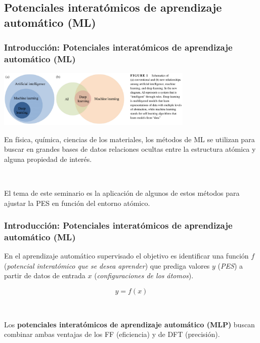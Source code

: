 \documentclass[aspectratio=169]{beamer}
\let\oldtextbf\textbf
\renewcommand{\textbf}[1]{\textcolor{nordblue}{\oldtextbf{#1}}}
\begin{document}
    \subsection{Potenciales interatómicos de aprendizaje automático (ML)}
    
    \begin{frame}
        \frametitle{Introducción: Potenciales interatómicos de aprendizaje 
        automático (ML)}

        \begin{center}
            \includegraphics[width=0.7\textwidth]{intro-definicion-ML.png}
        \end{center}

        \pause
    
        En física, química, ciencias de los materiales, los métodos de ML se
        utilizan para buscar en grandes bases de datos relaciones ocultas entre 
        la estructura atómica y alguna propiedad de interés.

        \ \pause

        El tema de este seminario es la aplicación de algunos de estos métodos
        para ajustar la PES en función del entorno atómico.

	\end{frame}
	
    \begin{frame}
        \frametitle{Introducción: Potenciales interatómicos de aprendizaje 
        automático (ML)}

        En el aprendizaje automático supervisado el objetivo es identificar una
        función $f$ (\textit{potencial interatómico que se desea aprender}) que
        prediga valores $y$ (\textit{PES}) a partir de datos de entrada $x$ 
        (\textit{configuraciones de los átomos}).
        
        $$
        y = f(x)
        $$

        \ \pause
        
        Los \textbf{potenciales interatómicos de aprendizaje automático (MLP)} 
        buscan combinar ambas ventajas de los FF (eficiencia) y de DFT 
        (precisión).

	\end{frame}
    
\end{document}
